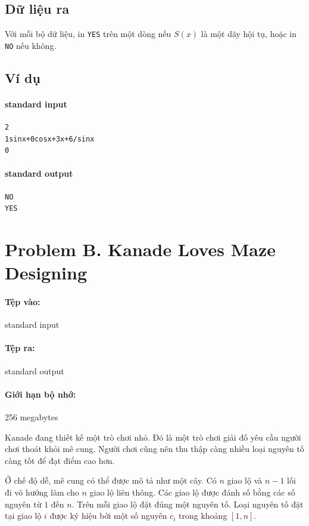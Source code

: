 \documentclass[11pt]{article}
\begin{document}
\subsection*{Dữ liệu ra}

Với mỗi bộ dữ liệu, in \texttt{YES} trên một dòng nếu \(S(x)\) là một dãy hội
tụ, hoặc in \texttt{NO} nếu không.

\subsection*{Ví dụ}

\paragraph{standard input}
\begin{verbatim}
2
1sinx+0cosx+3x+6/sinx
0
\end{verbatim}

\paragraph{standard output}
\begin{verbatim}
NO
YES
\end{verbatim}

\section{Problem B. Kanade Loves Maze Designing}

\paragraph{Tệp vào:} standard input
\paragraph{Tệp ra:} standard output
\paragraph{Giới hạn bộ nhớ:} 256 megabytes

Kanade đang thiết kế một trò chơi nhỏ. Đó là một trò chơi giải đố yêu cầu
người chơi thoát khỏi mê cung. Người chơi cũng nên thu thập càng nhiều loại
nguyên tố càng tốt để đạt điểm cao hơn.

Ở chế độ dễ, mê cung có thể được mô tả như một cây. Có \(n\) giao lộ và
\(n-1\) lối đi vô hướng làm cho \(n\) giao lộ liên thông. Các giao lộ được
đánh số bằng các số nguyên từ \(1\) đến \(n\). Trên mỗi giao lộ đặt đúng một
nguyên tố. Loại nguyên tố đặt tại giao lộ \(i\) được ký hiệu bởi một số
nguyên \(c_i\) trong khoảng \([1,n]\).
\end{document}

